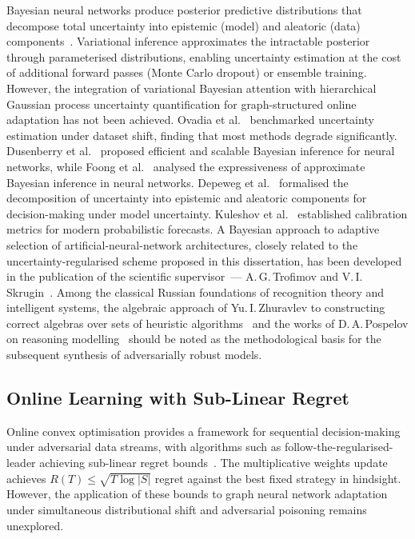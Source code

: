 Bayesian neural networks produce posterior predictive distributions that decompose total uncertainty into epistemic (model) and aleatoric (data) components~\cite{Gal2016,Blundell2015,Lakshminarayanan2017,Kendall2017}. Variational inference approximates the intractable posterior through parameterised distributions, enabling uncertainty estimation at the cost of additional forward passes (Monte Carlo dropout) or ensemble training. However, the integration of variational Bayesian attention with hierarchical Gaussian process uncertainty quantification for graph-structured online adaptation has not been achieved. Ovadia et al.~\cite{Ovadia2019} benchmarked uncertainty estimation under dataset shift, finding that most methods degrade significantly. Dusenberry et al.~\cite{Dusenberry2020} proposed efficient and scalable Bayesian inference for neural networks, while Foong et al.~\cite{Foong2019} analysed the expressiveness of approximate Bayesian inference in neural networks. Depeweg et al.~\cite{Depeweg2018} formalised the decomposition of uncertainty into epistemic and aleatoric components for decision-making under model uncertainty. Kuleshov et al.~\cite{Kuleshov2018} established calibration metrics for modern probabilistic forecasts. A Bayesian approach to adaptive selection of artificial-neural-network architectures, closely related to the uncertainty-regularised scheme proposed in this dissertation, has been developed in the publication of the scientific supervisor~--- A.\,G.\,Trofimov and V.\,I.\,Skrugin~\cite{Trofimov2019bayes}. Among the classical Russian foundations of recognition theory and intelligent systems, the algebraic approach of Yu.\,I.\,Zhuravlev to constructing correct algebras over sets of heuristic algorithms~\cite{Zhuravlev1977} and the works of D.\,A.\,Pospelov on reasoning modelling~\cite{Pospelov1989} should be noted as the methodological basis for the subsequent synthesis of adversarially robust models.


\subsection{Online Learning with Sub-Linear Regret}

Online convex optimisation provides a framework for sequential decision-making under adversarial data streams, with algorithms such as follow-the-regularised-leader achieving sub-linear regret bounds~\cite{Shalev2012,Arjovsky2017}. The multiplicative weights update achieves $R(T)\leq\sqrt{T\log|S|}$ regret against the best fixed strategy in hindsight. However, the application of these bounds to graph neural network adaptation under simultaneous distributional shift and adversarial poisoning remains unexplored.

